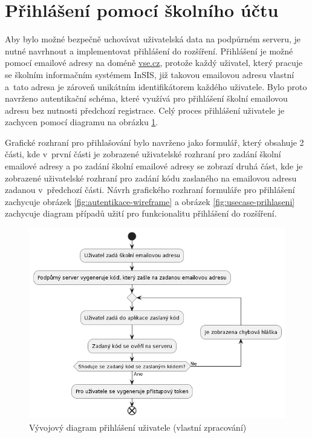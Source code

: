\section{Přihlášení pomocí školního účtu}

Aby bylo možné bezpečně uchovávat uživatelská data na podpůrném serveru, je nutné navrhnout a implementovat přihlášení do rozšíření. Přihlášení je možné pomocí emailové adresy na doméně \url{vse.cz}, protože každý uživatel, který pracuje se školním informačním systémem \mbox{InSIS}, již takovou emailovou adresu vlastní a~tato adresa je zároveň unikátním identifikátorem každého uživatele. Bylo proto navrženo autentikační schéma, které využívá pro přihlášení školní emailovou adresu bez nutnosti předchozí registrace.
Celý proces přihlášení uživatele je zachycen pomocí diagramu na obrázku \ref{fig:autentikace}.

Grafické rozhraní pro přihlašování bylo navrženo jako formulář, který obsahuje 2 části, kde v~první části je zobrazené uživatelské rozhraní pro zadání školní emailové adresy a po zadání školní emailové adresy se zobrazí druhá část, kde je zobrazené uživatelské rozhraní pro zadání kódu zaslaného na emailovou adresu zadanou v~předchozí části.
Návrh grafického rozhraní formuláře pro přihlášení zachycuje obrázek \ref{fig:autentikace-wireframe} a obrázek \ref{fig:usecase-prihlaseni} zachycuje diagram případů užití pro funkcionalitu přihlášení do rozšíření.

\begin{figure}[htbp!]\centering
    \includegraphics[width=\textwidth]{img/autentikace.png}
    \caption{Vývojový diagram přihlášení uživatele (vlastní zpracování)}
    \label{fig:autentikace}
\end{figure}



